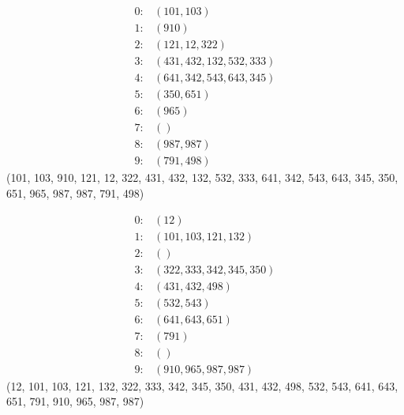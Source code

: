 \documentclass{article}
\begin{document}
\begin{align*}
    0: & \left(101, 103\right)                \\
    1: & \left(910\right)                     \\
    2: & \left(121, 12, 322\right)            \\
    3: & \left(431, 432, 132, 532, 333\right) \\
    4: & \left(641, 342, 543, 643, 345\right) \\
    5: & \left(350, 651\right)                \\
    6: & \left(965\right)                     \\
    7: & \left(\right)                        \\
    8: & \left(987, 987\right)                \\
    9: & \left(791, 498\right)
\end{align*}
(101, 103, 910, 121, 12, 322, 431, 432, 132, 532, 333, 641, 342, 543, 643, 345, 350, 651, 965, 987, 987, 791, 498)

\begin{align*}
    0: & \left(12\right)                      \\
    1: & \left(101, 103, 121, 132\right)      \\
    2: & \left(\right)                        \\
    3: & \left(322, 333, 342, 345, 350\right) \\
    4: & \left(431, 432, 498\right)           \\
    5: & \left(532, 543\right)                \\
    6: & \left(641, 643, 651\right)           \\
    7: & \left(791\right)                     \\
    8: & \left(\right)                        \\
    9: & \left(910, 965, 987, 987\right)
\end{align*}
(12, 101, 103, 121, 132, 322, 333, 342, 345, 350, 431, 432, 498, 532, 543, 641, 643, 651, 791, 910, 965, 987, 987)

\pagebreak
\end{document}
